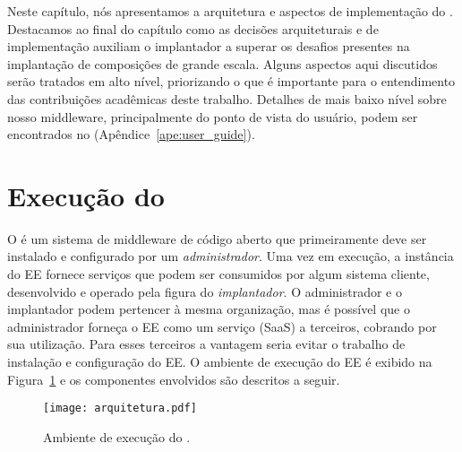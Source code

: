 Neste capítulo, nós apresentamos a arquitetura e aspectos de implementação do \ee.   
Destacamos ao final do capítulo
como as decisões arquiteturais e de implementação auxiliam o implantador
a superar os desafios presentes na implantação de composições de grande escala.
Alguns aspectos aqui discutidos serão tratados em alto nível,
priorizando o que é importante para o entendimento das contribuições
acadêmicas deste trabalho.
Detalhes de mais baixo nível sobre nosso middleware, principalmente do ponto de vista do
usuário, podem ser encontrados no \userguide (Apêndice~\ref{ape:user_guide}).

\section{Execução do \ee}

O \ee é um sistema de middleware de código aberto que primeiramente deve ser instalado e configurado por um \emph{administrador}.
Uma vez em execução, a instância do EE fornece serviços que podem ser consumidos por algum sistema cliente, desenvolvido
e operado pela figura do \emph{implantador}. O administrador e o implantador podem pertencer à mesma organização,
mas é possível que o administrador forneça o EE como um serviço (SaaS) a terceiros, cobrando por sua utilização.
Para esses terceiros a vantagem seria evitar o trabalho de instalação e configuração do EE.
O ambiente de execução do EE é exibido na Figura~\ref{fig:arquitetura} e os componentes envolvidos são descritos a seguir.

\begin{figure}[ht]
\centering
\texttt{[image: arquitetura.pdf]}
\caption{Ambiente de execução do \choreos \ee.}
\label{fig:arquitetura}
\end{figure}

